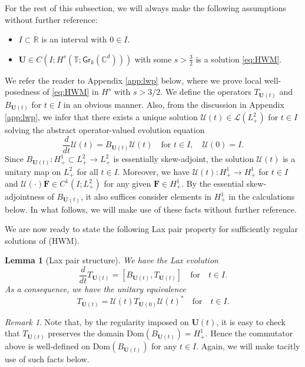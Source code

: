 \documentclass[10pt,reqno,a4paper]{amsart}
\newtheorem{lem}{Lemma}[section]
\theoremstyle{definition}
\theoremstyle{remark}
\theoremstyle{remark}
\newtheorem*{remark*}{Remark}
\numberwithin{equation}{section}
\newcommand{\C}{\mathbb{C}}
\newcommand{\R}{\mathbb{R}}
\newcommand{\T}{\mathbb{T}}
\newcommand{\dom}{\mathrm{Dom}}
\newcommand{\be}{\begin{equation}}
\newcommand{\ee}{\end{equation}}
\newcommand{\Ub}{\mathbf{U}}
\newcommand{\Fb}{\mathbf{F}}
\newcommand{\id}{I}
\newcommand{\Gr}{\mathsf{Gr}}
\newcommand{\Us}{\mathscr{U}}
\newcommand{\Ls}{\mathscr{L}}
\begin{document}
For the rest of this subsection, we will always make the following assumptions without further reference:
\begin{itemize}
\item $I \subset \R$ is an interval with $0 \in I$.
\item $\Ub \in C(I; H^s(\T; \Gr_k(\C^d)))$ with some $s > \frac{3}{2}$ is a solution \eqref{eq:HWM}.
\end{itemize}
We refer the reader to Appendix \ref{app:lwp} below, where we prove local well-posedness of \eqref{eq:HWM} in $H^s$ with $s > 3/2$. We define the operators $T_{\Ub(t)}$ and $B_{\Ub(t)}$ for $t \in I$ in an obvious manner. Also, from the discussion in Appendix \ref{app:lwp}, we infer that there exists a unique solution $\Us(t) \in \Ls(L^2_+)$ for $t \in I$ solving the abstract operator-valued evolution equation
\be \label{eq:Us_ode}
\frac{d}{dt} \Us(t) = B_{\Ub(t)} \Us(t) \quad \mbox{for $t \in I$}, \quad \Us(0) = \id.
\ee
Since $B_{\Ub(t)} : H^1_+ \subset L^2_+ \to L^2_+$ is essentially skew-adjoint, the solution $\Us(t)$ is a unitary map on $L^2_+$ for all $t \in I$. Moreover, we have $\Us(t) : H^1_+ \to  H^1_+$ for $t \in I$ and $\Us(\cdot) \Fb \in C^1(I; L^2_+)$ for any given $\Fb \in H^1_+$. By the essential skew-adjointness of $B_{\Ub(t)}$, it also suffices consider elements in $H^1_+$ in the calculations below. In what follows, we will make use of these facts without further reference. 

We are now ready to state the following Lax pair property for sufficiently regular solutions of (HWM).

\begin{lem}[Lax pair structure] \label{lem:Lax}
We have the Lax evolution
$$
\frac{d}{dt} T_{\Ub(t)} = \left [B_{\Ub(t)}, T_{\Ub(t)} \right ] \quad \mbox{for} \quad  t \in I.
$$
As a consequence, we have the unitary equivalence
$$
T_{\Ub(t)} = \Us(t) T_{\Ub(0)} \Us(t)^* \quad \mbox{for} \quad t \in I.
$$
\end{lem}

\begin{remark*}
Note that, by the regularity imposed on $\Ub(t)$, it is easy to check that $T_{\Ub(t)}$ preserves the domain $\dom(B_{\Ub(t)})=H^1_+$. Hence the commutator above is well-defined on $\dom(B_{\Ub(t)})$ for any $t \in I$. Again, we will make tacitly use of such facts below.
\end{remark*}
\end{document}
